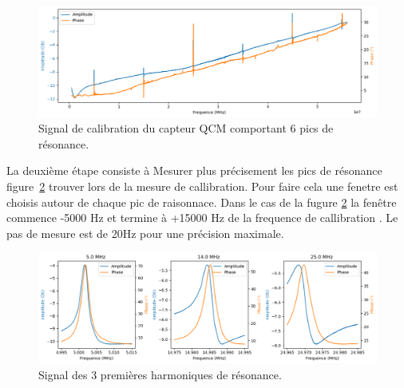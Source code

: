 \begin{figure}[H]
    \centering
    \includegraphics[width=\textwidth]{assets/figures/Calibration.png}
    \caption{Signal de calibration du capteur QCM comportant 6 pics de résonance.}
    \label{fig:calibration plot}
\end{figure}
La deuxième étape consiste à Mesurer plus précisement les pics de résonance figure~\ref{fig:harmonic plot} trouver lors de la mesure de callibration.
 Pour faire cela une fenetre est choisis autour de chaque pic de raisonnace. 
 Dans le cas de la fugure \ref{fig:harmonic plot} la fenêtre commence -5000 Hz et termine à +15000 Hz de la frequence de callibration . Le pas de mesure est de 20Hz pour une précision maximale.
\begin{figure}[H]
    \centering
    \includegraphics[width=\textwidth]{assets/figures/signalpeak.png}
    \caption{Signal des 3 premières harmoniques de résonance.}
    \label{fig:harmonic plot}
\end{figure}

